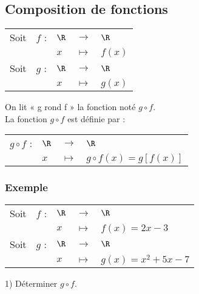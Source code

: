 
\ifdefined\COMPLETE
\else
    
    
\fi


\subsection{Composition de fonctions}

\begin{tabular}{lllll}
Soit & $f$ : & $\R$ & $\longrightarrow$ & $\R$ \\
& & $x$ & $\longmapsto$ & $f\left(x\right)$ \\
Soit & $g$ : & $\R$ & $\longrightarrow$ & $\R$ \\
& & $x$ & $\longmapsto$ & $g\left(x\right)$ \\
\end{tabular}

\vspace*{.3cm}

On lit « g rond f » la fonction noté $g \circ f$.  \\

La fonction $g \circ f$ est définie par : \\

\begin{tabular}{llll}
$g \circ f$ : & $\R$ & $\longrightarrow$ & $\R$ \\
& $x$ & $\longmapsto$ & $g \circ f\left(x\right) = g\left[f\left(x\right)\right]$ \\
\end{tabular}

\vspace*{.3cm}

\subsubsection{Exemple}

\begin{tabular}{lllll}
Soit & $f$ : & $\R$ & $\longrightarrow$ & $\R$ \\
& & $x$ & $\longmapsto$ & $f\left(x\right) = 2x - 3$\\
Soit & $g$ : & $\R$ & $\longrightarrow$ & $\R$ \\
& & $x$ & $\longmapsto$ & $g\left(x\right) = x^2 + 5x - 7$ \\
\end{tabular}

\vspace*{.3cm}

1) Déterminer $g \circ f$.

